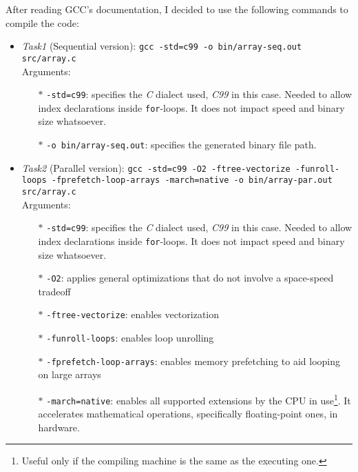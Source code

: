 After reading GCC's documentation\cite{GCC_vectorization, GCC_dev_opts, GCC_optimize_opts, GCC_x86_opts}, I decided %
to use the following commands to compile the code:
\begin{itemize}
    \item \textit{Task1} (Sequential version): \texttt{gcc -std=c99 -o bin/array-seq.out src/array.c}\\
        Arguments:
        \begin{itemize}
            \item[$\ast$] \texttt{-std=c99}: specifies the \textit{C} dialect used, \textit{C99} in this case. Needed to %
            allow index declarations inside \texttt{for}-loops. It does not impact speed and binary size whatsoever.
            \item[$\ast$] \texttt{-o bin/array-seq.out}: specifies the generated binary file path.
        \end{itemize}
    \item \textit{Task2} (Parallel version): \texttt{gcc -std=c99 -O2 -ftree-vectorize -funroll-loops %
        -fprefetch-loop-arrays -march=native -o bin/array-par.out src/array.c}\\
        Arguments:
        \begin{itemize}
            \item[$\ast$] \texttt{-std=c99}: specifies the \textit{C} dialect used, \textit{C99} in this case. Needed to %
            allow index declarations inside \texttt{for}-loops. It does not impact speed and binary size whatsoever.
            \item[$\ast$] \texttt{-O2}: applies general optimizations that do not involve a space-speed tradeoff%
                \cite{GCC_optimize_opts}
            \item[$\ast$] \texttt{-ftree-vectorize}: enables vectorization\cite{GCC_optimize_opts}
            \item[$\ast$] \texttt{-funroll-loops}: enables loop unrolling\cite{GCC_optimize_opts}
            \item[$\ast$] \texttt{-fprefetch-loop-arrays}: enables memory prefetching to aid looping on large arrays%
                \cite{GCC_optimize_opts}
            \item[$\ast$] \texttt{-march=native}: enables all supported extensions by the CPU in use\footnote{Useful %
                only if the compiling machine is the same as the executing one\cite{GCC_x86_opts}.}. It accelerates mathematical %
                operations, specifically floating-point ones, in hardware\cite{GCC_x86_opts}.
        \end{itemize}
\end{itemize}

